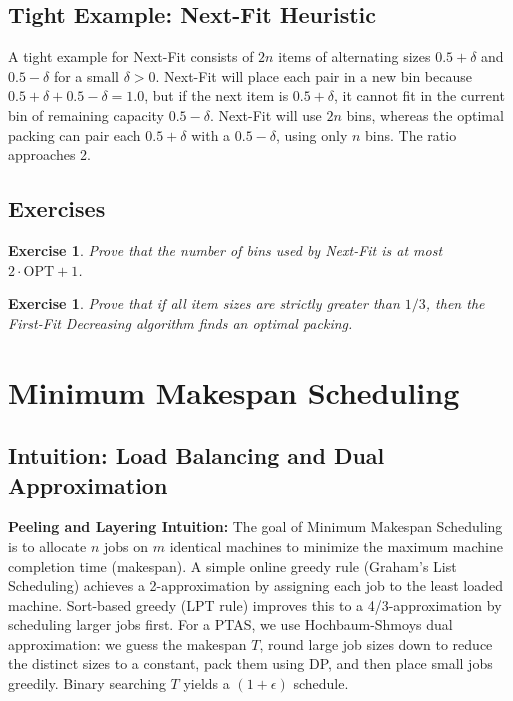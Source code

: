 \documentclass[11pt,oneside]{book}
\newtheorem{exercise}[theorem]{Exercise}
\begin{document}
\section{Tight Example: Next-Fit Heuristic}
A tight example for Next-Fit consists of $2n$ items of alternating sizes $0.5 + \delta$ and $0.5 - \delta$ for a small $\delta > 0$. Next-Fit will place each pair in a new bin because $0.5 + \delta + 0.5 - \delta = 1.0$, but if the next item is $0.5 + \delta$, it cannot fit in the current bin of remaining capacity $0.5 - \delta$. Next-Fit will use $2n$ bins, whereas the optimal packing can pair each $0.5+\delta$ with a $0.5-\delta$, using only $n$ bins. The ratio approaches 2.

\section{Exercises}
\begin{exercise}
Prove that the number of bins used by Next-Fit is at most $2 \cdot \text{OPT} + 1$.
\end{exercise}
\begin{exercise}
Prove that if all item sizes are strictly greater than $1/3$, then the First-Fit Decreasing algorithm finds an optimal packing.
\end{exercise}

\chapter{Minimum Makespan Scheduling}
\label{ch:makespan}

\section{Intuition: Load Balancing and Dual Approximation}

\begin{intuitionbox}
\textbf{Peeling and Layering Intuition:} The goal of Minimum Makespan Scheduling is to allocate $n$ jobs on $m$ identical machines to minimize the maximum machine completion time (makespan). A simple online greedy rule (Graham's List Scheduling) achieves a 2-approximation by assigning each job to the least loaded machine. Sort-based greedy (LPT rule) improves this to a 4/3-approximation by scheduling larger jobs first. For a PTAS, we use Hochbaum-Shmoys dual approximation: we guess the makespan $T$, round large job sizes down to reduce the distinct sizes to a constant, pack them using DP, and then place small jobs greedily. Binary searching $T$ yields a $(1+\epsilon)$ schedule.
\end{intuitionbox}
\end{document}
